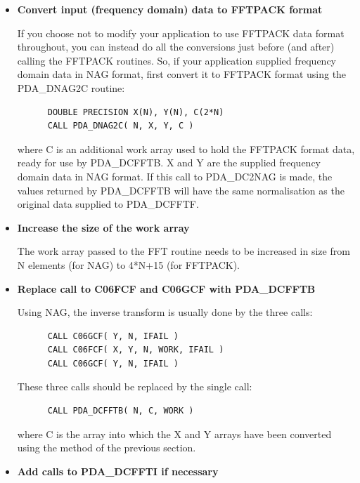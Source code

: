\documentclass[11pt,twoside]{article}
\newcommand{\htmlref}[2]{#1}
\begin{document}
\begin{itemize}

\item{\bf Convert input (frequency domain) data to FFTPACK format}

   If you choose not to modify your application to use FFTPACK data
   format throughout, you can instead do all the conversions just
   before (and after) calling the FFTPACK routines. So, if your
   application supplied frequency domain data in NAG format, first
   convert it to FFTPACK format using the
\htmlref{PDA\_DNAG2C}{PDA\_NAG2C}
   routine:

\begin{verbatim}
      DOUBLE PRECISION X(N), Y(N), C(2*N)
      CALL PDA_DNAG2C( N, X, Y, C )
\end{verbatim}

   where C is an additional work array used to hold the FFTPACK format
   data, ready for use by PDA\_DCFFTB. X and Y are the supplied frequency
   domain data in NAG format. If this call to PDA\_DC2NAG is made, the values
   returned by PDA\_DCFFTB will have the same normalisation as the original
   data supplied to PDA\_DCFFTF.

\item{\bf Increase the size of the work array}

   The work array passed to the FFT routine needs to be increased in
   size from N elements (for NAG) to 4*N+15 (for FFTPACK).

\item{\bf Replace call to C06FCF and C06GCF with
\htmlref{PDA\_DCFFTB}{PDA\_CFFTB}}

   Using NAG, the inverse transform is usually done by the three calls:

\begin{verbatim}
      CALL C06GCF( Y, N, IFAIL )
      CALL C06FCF( X, Y, N, WORK, IFAIL )
      CALL C06GCF( Y, N, IFAIL )
\end{verbatim}

   These three calls should be replaced by the single call:

\begin{verbatim}
      CALL PDA_DCFFTB( N, C, WORK )
\end{verbatim}

   where C is the array into which the X and Y arrays have been converted
   using the method of the previous section.

\item{\bf Add calls to
\htmlref{PDA\_DCFFTI}{PDA\_CFFTI}
   if necessary}


\end{itemize}
\end{document}
